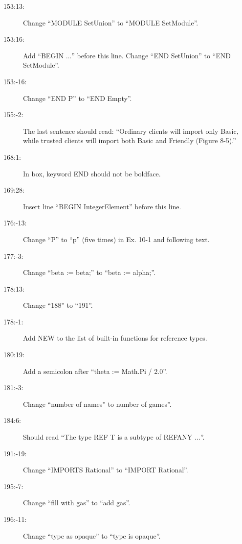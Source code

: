 \begin{description}
\item[153:13:] Change ``{\sf MODULE SetUnion}'' to ``{\sf MODULE SetModule}''.

\item[153:16:] Add ``{\sf BEGIN} $\ldots$'' before this line.  Change
``{\sf END SetUnion}'' to ``{\sf END SetModule}''.

\item[153:-16:] Change ``{\sf END P}'' to ``{\sf END Empty}''.

\item[155:-2:] The last sentence should read: ``Ordinary clients will 
import only {\sf Basic}, while trusted clients will import both {\sf Basic}
and {\sf Friendly} (Figure 8-5).''

\item[168:1:] In box, keyword {\sf END} should not be boldface.

\item[169:28:] Insert line ``{\sf BEGIN IntegerElement}'' before this line.

\item[176:-13:] Change ``{\sf P}'' to ``{\sf p}'' (five times) in Ex. 10-1 and 
following text.

\item[177:-3:] Change ``{\sf beta := beta;}'' to ``{\sf beta := alpha;}''.

\item[178:13:] Change ``188'' to ``191''.

\item[178:-1:] Add {\sf NEW}
to the list of built-in functions for reference types.

\item[180:19:] Add a semicolon after ``{\sf theta := Math.Pi / 2.0}''.

\item[181:-3:] Change ``number of names'' to number of games''.

\item[184:6:] Should read ``The type {\sf REF T} is a subtype of
{\sf REFANY} $\ldots$''.

\item[191:-19:] Change ``{\sf IMPORTS Rational}'' to ``{\sf IMPORT Rational}''.

\item[195:-7:] Change ``fill with gas'' to ``add gas''.

\item[196:-11:] Change ``type as opaque'' to ``type is opaque''.


\end{description}
